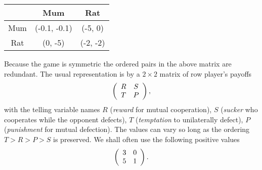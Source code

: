 \begin{center}
  \begin{tabular}{ | c | c | c | }
    \hline
    & Mum & Rat \\
    \hline
    Mum & (-0.1, -0.1) & (-5, 0) \\ \hline
    Rat & (0, -5) & (-2, -2)  \\ \hline
  \end{tabular}
\end{center}

Because the game is symmetric the ordered pairs in the above matrix are redundant. The usual representation is by a $2\times2$ matrix of row player's payoffs
\[
\left(
\begin{array}{c c}
R & S \\
T & P
\end{array}
\right)
,
\]
with the telling variable names $R$ (\textit{reward} for mutual cooperation), $S$ (\textit{sucker} who cooperates while the opponent defects), $T$ (\textit{temptation} to unilaterally defect), $P$ (\textit{punishment} for mutual defection). The values can vary so long as the ordering $T > R > P > S$ is preserved. We shall often use the following positive values
\[
\left(
\begin{array}{c c}
3 & 0 \\
5 & 1
\end{array}
\right)
.\]


